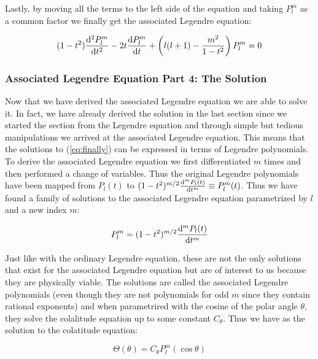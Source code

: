 \documentclass{article}
\begin{document}
    Lastly, by moving all the terms to the left side of the equation and taking $P^{m}_{l}$ as a common factor we finally get the associated Legendre equation:

    \begin{equation}
        \label{eq:finally}
        (1 - t^2)\odv[order = 2]{P^{m}_{l}}{t} - 2t\odv{P^{m}_{l}}{t} + \left(l(l + 1) - \frac{m^2}{1 - t^2}\right)P^{m}_{l} = 0
    \end{equation}

    \subsubsection{Associated Legendre Equation Part 4: The Solution}

    Now that we have derived the associated Legendre equation we are able to solve it. In fact, we have already derived the solution in the last section since we started the section
    from the Legendre equation and through simple but tedious manipulations we arrived at the associated Legendre equation. This means that the solutions to (\ref{eq:finally}) can be
    expressed in terms of Legendre polynomials. To derive the associated Legendre equation we first differentiated $m$ times and then performed a change of variables. Thus the original
    Legendre polynomials have been mapped from $P_{l}(t)$ to $(1 - t^2)^{m/2}\odv[order = m]{P_{l}(t)}{t} \equiv P^{m}_{l}(t)$. Thus we have found a family of solutions to the associated
    Legendre equation parametrized by $l$ and a new index $m$:

    \begin{equation}
        P^{m}_{l} = (1 - t^2)^{m/2}\odv[order = m]{P_{l}(t)}{t}
    \end{equation}

    Just like with the ordinary Legendre equation, these are not the only solutions that exist for the associated Legendre equation but are of interest to us because they are physically
    viable. The solutions are called the associated Legendre polynomials (even though they are not polynomials for odd $m$ since they contain rational exponents) and when parametrired with
    the cosine of the polar angle $\theta$, they solve the colalitude equation up to some constant $C_{\theta}$. Thus we have as the solution to the colatitude equation:

    \begin{equation}
        \label{eq:colatitude}
        \boxed{\Theta(\theta) = C_{\theta}P^{m}_{l}(\cos\theta)}
    \end{equation}
\end{document}

